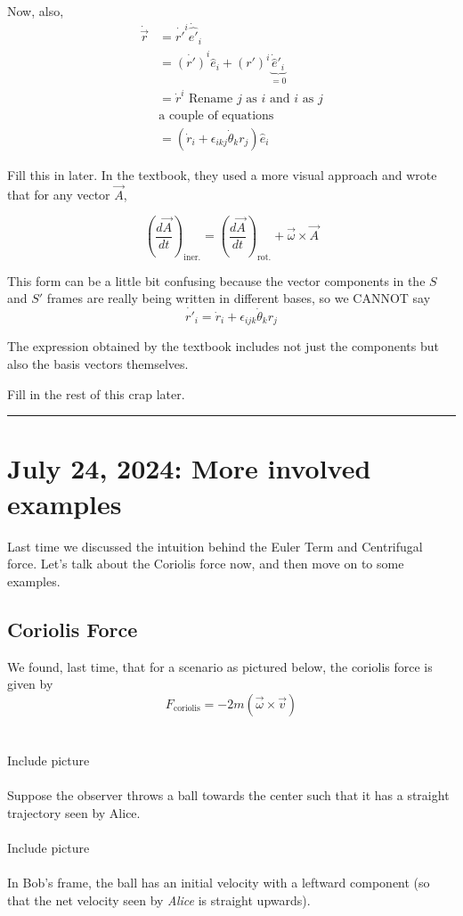 \documentclass[11pt]{article}
\begin{document}
\vskip 0.5cm
Now, also, 
\begin{align*}
  \dot{\vec{r}} &= \dot{r'}^i \dot{\hat{e'}}_i \\
  &= \dot{(r')}^i \hat{e}_i + (r')^i \underbrace{\dot{\hat{e}}'_i}_{=0} \\
  &= \dot{r}^i  \text{ Rename $j$ as $i$ and $i$ as $j$}\\ 
  &\text{a couple of equations} \\
  &= \left( \dot{r}_i + \epsilon_{ikj} \dot{\theta}_k r_j\right)
 \hat{e}_i\end{align*}

Fill this in later.
\vskip 0.5cm
In the textbook, they used a more visual approach and wrote that for any vector $\vec{A}$,

\[ \left(\frac{d\vec{A}}{dt}\right)_{\text{iner.}} = \left(\frac{d\vec{A}}{dt}\right)_{\text{rot.}} + \vec{\omega} \times \vec{A}  \]

\vskip 0.5cm
This form can be a little bit confusing because the vector components in the $S$ and $S'$ frames are really being written in different bases, so we CANNOT say 
\[ \dot{r'}_i = \dot{r}_i + \epsilon_{ijk} \dot{\theta}_k r_j \]

\vskip 0.5cm
The expression obtained by the textbook includes not just the components but also the basis vectors themselves.

\vskip 0.5cm
Fill in the rest of this crap later. 
\hrule

\pagebreak
\section{July 24, 2024: More involved examples}

Last time we discussed the intuition behind the Euler Term and Centrifugal force. Let's talk about the Coriolis force now, and then move on to some examples.
\\
\subsection{Coriolis Force}
We found, last time, that for a scenario as pictured below, the coriolis force is given by
\[F_{\text{coriolis}} = -2m\left(\vec{\omega} \times \vec{v}\right) \]
\\
\\
Include picture
\\
\\
Suppose the observer throws a ball towards the center such that it has a straight trajectory seen by Alice. 
\\
\\
Include picture
\\
\\
In Bob's frame, the ball has an initial velocity with a leftward component (so that the net velocity seen by \emph{Alice} is straight upwards).
\end{document}
